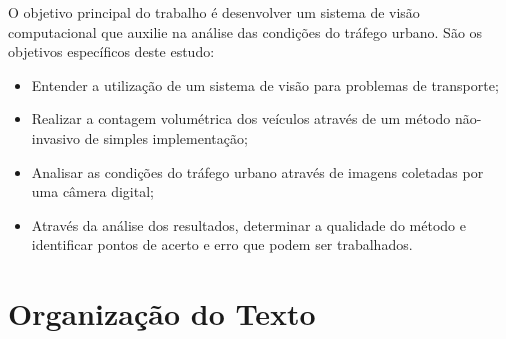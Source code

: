 O objetivo principal do trabalho é desenvolver um sistema de visão computacional que auxilie na análise das condições do tráfego urbano. São os objetivos específicos deste estudo:
\begin{itemize}
  \item Entender a utilização de um sistema de visão para problemas de transporte;
  \item Realizar a contagem volumétrica dos veículos através de um método não-invasivo de simples implementação;
  \item Analisar as condições do tráfego urbano através de imagens coletadas por uma câmera digital;
  \item Através da análise dos resultados, determinar a qualidade do método e identificar pontos de acerto e erro que podem ser trabalhados.
\end{itemize}







\section{Organização do Texto} %
\label{sec:organiza_o_do_texto}

